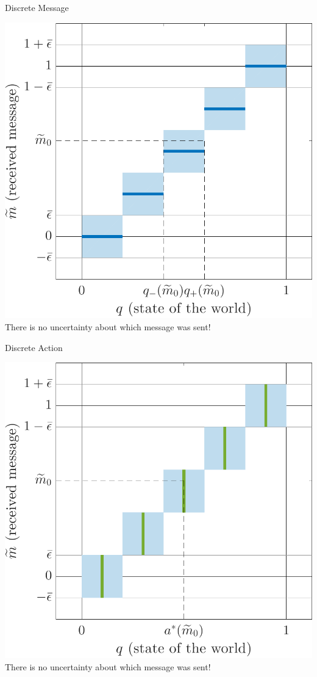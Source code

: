 \documentclass[hyperref={colorlinks=true,linkcolor=blue,citecolor=blue}]{beamer}
\begin{document}
\begin{frame}{Discrete Message}
\begin{center}
\includegraphics[scale=.45]{DiscreteMessagePlot}\\
There is no uncertainty about which message was sent!
\end{center}
\end{frame}

\begin{frame}{Discrete Action}
\begin{center}
\includegraphics[scale=.45]{DiscreteActionPlot}\\
There is no uncertainty about which message was sent!
\end{center}
\end{frame}
\end{document}
